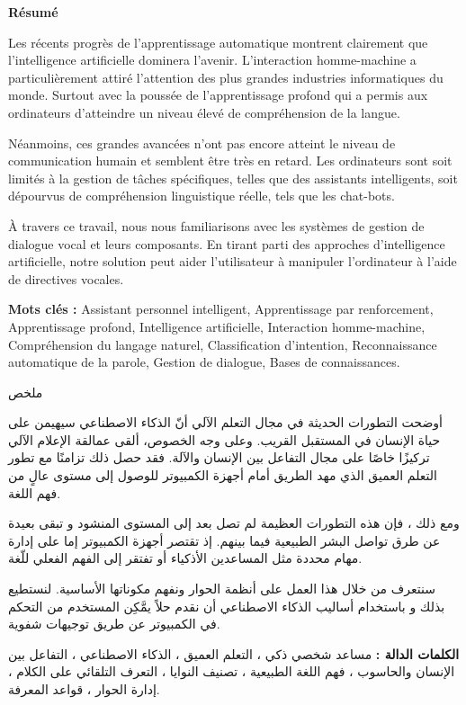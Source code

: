 \begin{center}
    \Large 
    \textbf{Résumé}
\end{center}
\setlength{\parindent}{0.4cm}
Les récents progrès de l'apprentissage automatique montrent clairement que l'intelligence artificielle dominera l'avenir.
L'interaction homme-machine a particulièrement attiré l'attention des plus grandes industries informatiques du monde.
Surtout avec la poussée de l'apprentissage profond qui a permis aux ordinateurs d'atteindre un niveau élevé de compréhension de la langue.
\par 
Néanmoins, ces grandes avancées n'ont pas encore atteint le niveau de communication humain et semblent être très en retard.
Les ordinateurs sont soit limités à la gestion de tâches spécifiques, telles que des assistants intelligents, soit dépourvus de compréhension linguistique réelle, tels que les chat-bots.
\par 
À travers ce travail, nous nous familiarisons avec les systèmes de gestion de dialogue vocal et leurs composants.
En tirant parti des approches d'intelligence artificielle, notre solution peut aider l'utilisateur à manipuler l'ordinateur à l'aide de directives vocales.
\par
\noindent
\textbf{Mots clés :} Assistant personnel intelligent, Apprentissage par renforcement, Apprentissage profond, Intelligence artificielle, Interaction homme-machine, Compréhension du langage naturel, Classification d'intention, Reconnaissance automatique de la parole, Gestion de dialogue, Bases de connaissances.

\vspace*{0.8cm}

\begin{center}
    \Large 
    \begin{arab}
    ملخص
    \end{arab}
\end{center}
\begin{arab}
	أوضحت التطورات الحديثة في مجال التعلم الآلي أنّ الذكاء الاصطناعي سيهيمن على حياة الإنسان في المستقبل القريب. وعلى وجه الخصوص، ألقى عمالقة الإعلام الآلي تركيزًا خاصًا على مجال التفاعل بين الإنسان والآلة. فقد حصل ذلك تزامنًا مع تطور التعلم العميق الذي مهد الطريق أمام أجهزة الكمبيوتر للوصول إلى مستوى عالٍ من فهم اللغة.
	
	ومع ذلك ، فإن هذه التطورات العظيمة لم تصل بعد إلى المستوى المنشود و تبقى بعيدة عن طرق تواصل البشر الطبيعية فيما بينهم. إذ تقتصر أجهزة الكمبيوتر إما على إدارة مهام محددة مثل المساعدين الأذكياء أو تفتقر إلى الفهم الفعلي للّغة.
	
	سنتعرف من خلال هذا العمل على أنظمة الحوار ونفهم مكوناتها الأساسية. لنستطيع بذلك و باستخدام أساليب الذكاء الاصطناعي أن نقدم حلاً  يمَّكِن المستخدم من التحكم في الكمبيوتر عن طريق توجيهات شفوية.
\par 
\textbf{الكلمات الدالة :} مساعد شخصي ذكي ، التعلم العميق ، الذكاء الاصطناعي ، التفاعل بين الإنسان والحاسوب ، فهم اللغة الطبيعية ، تصنيف النوايا ، التعرف التلقائي على الكلام ، إدارة الحوار ، قواعد المعرفة.
\end{arab}

